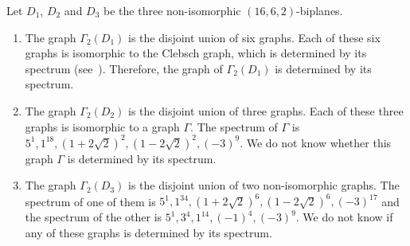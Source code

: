 \documentclass[letterpaper,10pt]{article}
\theoremstyle{plain}
\theoremstyle{definition}
\begin{document}
Let $D_1$, $D_2$ and $D_3$ be the three non-isomorphic $(16,6,2)$-biplanes. 
\begin{enumerate}
\item The graph $\Gamma_2(D_1)$ is the disjoint union of six graphs. 
Each of these six graphs is isomorphic to the Clebsch graph, which is determined by its spectrum (see~\cite[Section 10.6 ]{GR}).
Therefore, the graph of $\Gamma_2(D_1)$ is  determined by its spectrum.

 \item The graph $\Gamma_2(D_2)$ is the disjoint union of three graphs. 
Each of these three graphs is isomorphic to a graph $\Gamma$. %
The spectrum of $\Gamma$ is $5^1, 1^{18}, (1+2\sqrt{2})^2, (1-2\sqrt{2})^2, (-3)^9$. 
We do not know whether this graph $\Gamma$ is determined by its spectrum. 
 
\item The graph $\Gamma_2(D_3)$ is the disjoint union of two non-isomorphic graphs. The spectrum of one of them is
$5^1, 1^{34}, (1+2\sqrt{2})^6,(1-2\sqrt{2})^6, (-3)^{17}$ and the spectrum of the other is $5^1,3^{4},1^{14},(-1)^{4},(-3)^9$. 
We do not know if any of these graphs is determined by its spectrum.
\end{enumerate}
\end{document}
